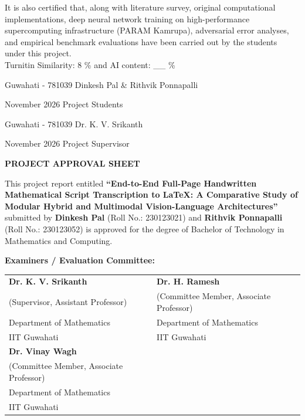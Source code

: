 \documentclass[12pt,a4paper]{report}
\theoremstyle{plain}
\theoremstyle{definition}
\theoremstyle{remark}
\begin{document}
\noindent
It is also certified that, along with literature survey,
original computational implementations, deep neural network training on high-performance supercomputing infrastructure (PARAM Kamrupa), adversarial error analyses, and empirical benchmark evaluations have been carried out by the students under this project.\\

\vspace{0.3cm}
\noindent
Turnitin Similarity: 8 \% and AI content: \_\_ \%

\vspace{1.8cm}

\noindent Guwahati - 781039 \hfill Dinkesh Pal \& Rithvik Ponnapalli

\noindent November 2026 \hfill Project Students

\vspace{1.5cm}

\noindent Guwahati - 781039 \hfill Dr. K. V. Srikanth

\noindent November 2026 \hfill Project Supervisor

\clearpage

\begin{center}
{\Large{\bf{PROJECT APPROVAL SHEET}}}
\end{center}
\vspace{0.6cm}

\noindent
This project report entitled \textbf{``End-to-End Full-Page Handwritten Mathematical Script Transcription to LaTeX: A Comparative Study of Modular Hybrid and Multimodal Vision-Language Architectures''} submitted by \textbf{Dinkesh Pal} (Roll No.: 230123021) and \textbf{Rithvik Ponnapalli} (Roll No.: 230123052) is approved for the degree of Bachelor of Technology in Mathematics and Computing.

\vspace{1.5cm}

\noindent
\textbf{Examiners / Evaluation Committee:}

\vspace{1.5cm}

\noindent
\begin{tabular}{@{}p{7.2cm}p{7.2cm}@{}}
\textbf{Dr. K. V. Srikanth} & \textbf{Dr. H. Ramesh} \\
(Supervisor, Assistant Professor) & (Committee Member, Associate Professor) \\
Department of Mathematics & Department of Mathematics \\
IIT Guwahati & IIT Guwahati \\[1.8cm]
\textbf{Dr. Vinay Wagh} & \\
(Committee Member, Associate Professor) & \\
Department of Mathematics & \\
IIT Guwahati & 
\end{tabular}
\end{document}
